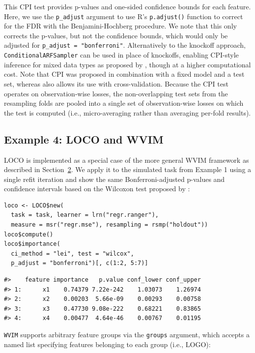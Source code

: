 This CPI test provides p-values and one-sided confidence bounds for each feature.
Here, we use the \texttt{p\_adjust} argument to use R's \texttt{p.adjust()} function to correct for the FDR with the Benjamini-Hochberg procedure.
We note that this only corrects the p-values, but not the confidence bounds, which would only be adjusted for \texttt{p\_adjust\ =\ "bonferroni"}.
Alternatively to the knockoff approach, \texttt{ConditionalARFSampler} can be used in place of knockoffs, enabling CPI-style inference for mixed data types as proposed by \citet{blesch2025conditionalfeaturea}, though at a higher computational cost.
Note that CPI was proposed in combination with a fixed model and a test set, whereas  also allows its use with cross-validation.
Because the CPI test operates on observation-wise losses, the non-overlapping test sets from the resampling folds are pooled into a single set of observation-wise losses on which the test is computed (i.e., micro-averaging rather than averaging per-fold results).

\subsection{Example 4: LOCO and WVIM}\label{example-4-loco-and-wvim}

LOCO is implemented as a special case of the more general WVIM framework as described in Section~\hyperref[sec-fi-methods]{2}.
We apply it to the simulated task from Example 1 using a single refit iteration and show the same Bonferroni-adjusted p-values and confidence intervals based on the Wilcoxon test proposed by \citet{lei2018distributionfreepredictivec}:

\begin{verbatim}
loco <- LOCO$new(
  task = task, learner = lrn("regr.ranger"),
  measure = msr("regr.mse"), resampling = rsmp("holdout"))
loco$compute()
loco$importance(
  ci_method = "lei", test = "wilcox", 
  p_adjust = "bonferroni")[, c(1:2, 5:7)]
\end{verbatim}

\begin{verbatim}
#>    feature importance   p.value conf_lower conf_upper
#> 1:      x1    0.74379 7.22e-242    1.03073    1.26974
#> 2:      x2    0.00203  5.66e-09    0.00293    0.00758
#> 3:      x3    0.47730 9.08e-222    0.68221    0.83865
#> 4:      x4    0.00477  4.64e-46    0.00767    0.01195
\end{verbatim}

\texttt{WVIM} supports arbitrary feature groups via the \texttt{groups} argument, which accepts a named list specifying features belonging to each group (i.e., LOGO):

